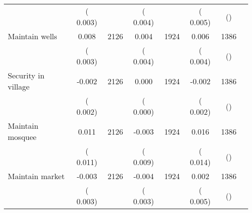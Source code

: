 \begin{tabular}{l*{6}{c}}
                       &       (       0.003)            &                               &       (       0.004)            &                               &       (       0.005)            &       () &                  \\
Maintain wells        &              0.008      &       2126       &              0.004      &       1924       &              0.006      &       1386  &  &              \\
                       &       (       0.003)            &                               &       (       0.004)            &                               &       (       0.004)            &       () &                  \\
Security in village        &             -0.002      &       2126       &              0.000      &       1924       &             -0.002      &       1386  &  &              \\
                       &       (       0.002)            &                               &       (       0.000)            &                               &       (       0.002)            &       () &                  \\
Maintain mosquee        &              0.011      &       2126       &             -0.003      &       1924       &              0.016      &       1386  &  &              \\
                       &       (       0.011)            &                               &       (       0.009)            &                               &       (       0.014)            &       () &                  \\
Maintain market        &             -0.003      &       2126       &             -0.004      &       1924       &              0.002      &       1386  &  &              \\
                       &       (       0.003)            &                               &       (       0.003)            &                               &       (       0.005)            &       () &                  \\
\hline \end{tabular}